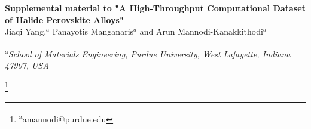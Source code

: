 \documentclass[twoside,twocolumn,9pt]{article}
\begin{document}
    \begin{center}
      \vspace*{0.5cm}
      \Large
      \textbf{Supplemental material to "A High-Throughput Computational Dataset of Halide Perovskite Alloys"\\}
      \vspace{0.5cm}
      \large
      Jiaqi Yang,\textit{$^{a}$} Panayotis Manganaris\textit{$^{a}$} and Arun Mannodi-Kanakkithodi\textit{$^{a}$} \\
      \vspace{0.3cm}

      \normalsize
      \textsuperscript{a}\textit{School of Materials Engineering, Purdue University, West Lafayette, Indiana 47907, USA} \\
    \end{center}

    \footnote{
    \textsuperscript{a}amannodi@purdue.edu\hspace{0.3cm}}

    \vspace{1cm}



\end{document}
